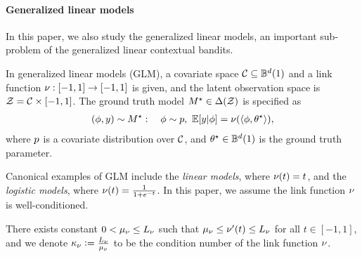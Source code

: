 \paragraph{Generalized linear models}
In this paper, we also study the generalized linear models, an important sub-problem of the generalized linear contextual bandits. 
\begin{definition}\label{def:GLM}
In generalized linear models (GLM), a covariate space $\mathcal{C}\subseteq \mathbb{B}^d(1)$ and a link function $\nu:[-1,1]\to[-1,1]$ is given, and the latent observation space is $\mathcal{Z}=\mathcal{C}\times [-1,1]$. The ground truth model $M^\star\in\Delta(\mathcal{Z})$ is specified as
\begin{align*}
    (\phi,y)\sim M^\star: \quad \phi\sim p, ~~
    \mathbb{E}[y|\phi]=\nu(\langle \phi,\theta^\star\rangle),
\end{align*}
where $p$ is a covariate distribution over $\mathcal{C}$, and $\theta^\star\in\mathbb{B}^d(1)$ is the ground truth parameter. 
\end{definition}

Canonical examples of GLM include the \emph{linear models}, where $\nu(t)=t$, and the \emph{logistic models}, where $\nu(t)=\frac{1}{1+e^{-t}}$. 
In this paper, we assume the link function $\nu$ is well-conditioned.
\begin{assumption}\label{asmp:link}
There exists constant $0<\mu_\nu\leq L_\nu$ such that $\mu_\nu\leq \nu'(t)\leq L_\nu$ for all $t\in[-1,1]$, and we denote $\kappa_\nu\mathrel{\mathop:}= \frac{L_\nu}{\mu_\nu}$ to be the condition number of the link function $\nu$.
\end{assumption}
